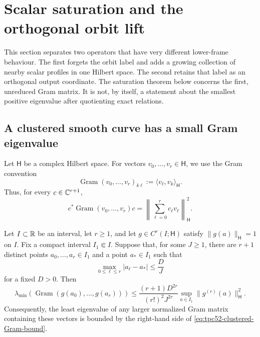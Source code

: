 \section{Scalar saturation and the orthogonal orbit lift}
\label{sec:tpc52-scalar-saturation}

This section separates two operators that have very different lower-frame
behaviour.  The first forgets the orbit label and adds a growing collection
of nearby scalar profiles in one Hilbert space.  The second retains that
label as an orthogonal output coordinate.  The saturation theorem below
concerns the first, unreduced Gram matrix.  It is not, by itself, a statement
about the smallest positive eigenvalue after quotienting exact relations.

\subsection{A clustered smooth curve has a small Gram eigenvalue}

Let \(\mathsf H\) be a complex Hilbert space.  For vectors
\(v_0,\ldots,v_r\in\mathsf H\), we use the Gram convention
\begin{equation}
 \operatorname{Gram}(v_0,\ldots,v_r)_{k\ell}
 :=\langle v_\ell,v_k\rangle_{\mathsf H}.
 \label{eq:tpc52-Gram-convention}
\end{equation}
Thus, for every \(c\in\mathbb C^{r+1}\),
\begin{equation}
 c^*\operatorname{Gram}(v_0,\ldots,v_r)c
 =\left\|\sum_{\ell=0}^r c_\ell v_\ell\right\|_{\mathsf H}^2.
 \label{eq:tpc52-Gram-quadratic-form}
\end{equation}

\begin{theorem}
\label{thm:tpc52-scalar-saturation}
Let \(I\subset\mathbb R\) be an interval, let \(r\geq1\), and let
\(g\in C^r(I;\mathsf H)\) satisfy \(\|g(a)\|_{\mathsf H}=1\) on
\(I\).  Fix a compact interval \(I_1\Subset I\).  Suppose that, for
some \(J\geq1\), there are \(r+1\) distinct points
\(a_0,\ldots,a_r\in I_1\) and a point \(a_*\in I_1\) such that
\begin{equation}
 \max_{0\leq\ell\leq r}|a_\ell-a_*|\leq \frac{D}{J}
 \label{eq:tpc52-cluster-width}
\end{equation}
for a fixed \(D>0\).  Then
\begin{equation}
 \lambda_{\min}\!\left(
   \operatorname{Gram}(g(a_0),\ldots,g(a_r))
 \right)
 \leq
 \frac{(r+1)D^{2r}}{(r!)^2J^{2r}}
 \sup_{a\in I_1}\|g^{(r)}(a)\|_{\mathsf H}^2.
 \label{eq:tpc52-clustered-Gram-bound}
\end{equation}
Consequently, the least eigenvalue of any larger normalized Gram matrix
containing these vectors is bounded by the right-hand side of
\eqref{eq:tpc52-clustered-Gram-bound}.
\end{theorem}

